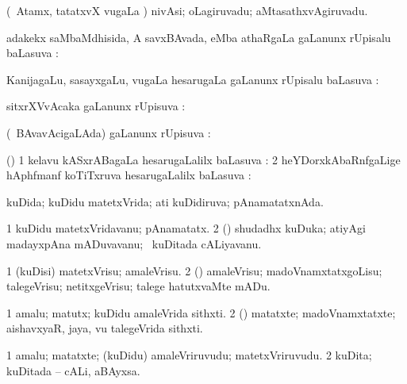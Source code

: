 \bentry
{}
\gl{\nA}
\bmng
(\sA\ Atamx, tatatxvX \mo vugaLa \vi) nivAsi; oLagiruvadu; aMtasathxvAgiruvadu. 
\emng
\eentry

\bentry
{}
\gl{\uparx}
\bmng
adakekx saMbaMdhisida, A savxBAvada, eMba athaRgaLa \gu gaLanunx rUpisalu baLasuva \uparx:  
\emng
\eentry

\bentry
{}
\gl{\uparx}
\bmng
KanijagaLu, sasayxgaLu, \mo vugaLa hesarugaLa \gu gaLanunx rUpisalu baLasuva \uparx:  
\emng
\eentry

\bentry
{}
\gl{\uparx}
\bmng
sitxrXVvAcaka \nA gaLanunx rUpisuva \uparx:  
\emng
\eentry

\bentry
{}
\gl{\uparx}
\bmng
(\kanmu\ BAvavAcigaLAda) \nA gaLanunx rUpisuva \uparx:  
\emng
\eentry

\bentry
{}
\gl{\uparx}
\bmng
(\ravi) 
\bnum
\num{1} kelavu kASxrABagaLa hesarugaLalilx baLasuva \uparx:  
\num{2} heYDorxkAbaRnfgaLige hAphfmanf koTiTxruva hesarugaLalilx baLasuva \uparx:  
\enum
\emng
\eentry

\bentry
{}
\gl{\gu}
\bmng
kuDida; kuDidu matetxVrida; ati kuDidiruva; pAnamatatxnAda. 
\emng
\eentry

\bentry
{}
\gl{\nA}
\bmng
\bnum
\num{1} kuDidu matetxVridavanu; pAnamatatx. 
\num{2} (\kanmu) shudadhx kuDuka; atiyAgi madayxpAna mADuvavanu; \kanmu\ kuDitada cALiyavanu. 
\enum
\emng
\eentry

\bentry
{}
\gl{\sakirx}
\bmng
\bnum
\num{1} (kuDisi) matetxVrisu; amaleVrisu. 
\num{2} (\rUpa) amaleVrisu; madoVnamxtatxgoLisu; talegeVrisu; netitxgeVrisu; talege hatutxvaMte mADu. 
\enum
\emng
\eentry

\bentry
{}
\gl{\nA}
\bmng
\bnum
\num{1} amalu; matutx; kuDidu amaleVrida sithxti. 
\num{2} (\rUpa) matatxte; madoVnamxtatxte; aishavxyaR, jaya, \mo vu talegeVrida sithxti. 
\enum
\emng
\eentry

\bentry
{}
\gl{\nA}
\bmng
\bnum
\num{1} amalu; matatxte; (kuDidu) amaleVriruvudu; matetxVriruvudu. 
\num{2} kuDita; kuDitada -- cALi, aBAyxsa. 
\enum
\emng
\eentry

